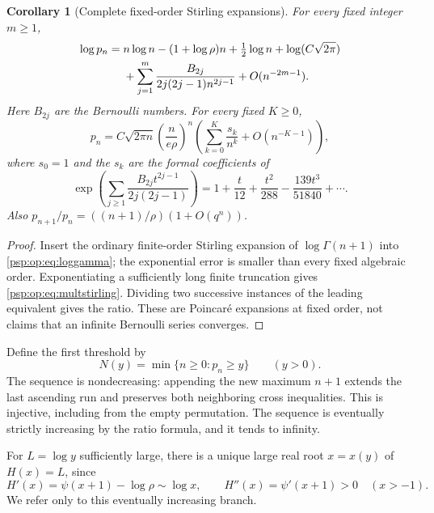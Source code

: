 \documentclass[11pt,letterpaper]{article}
\numberwithin{equation}{section}
\newtheorem{corollary}[theorem]{Corollary}
\theoremstyle{remark}\newtheorem{remark}[theorem]{Remark}
\begin{document}
\begin{corollary}[Complete fixed-order Stirling expansions]\label{psp:op:cor:stirling}
For every fixed integer $m\geq1$,
\begin{align}
 \log p_n={}&n\log n-(1+\log\rho)n+\tfrac12\log n
       +\log(C\sqrt{2\pi})\notag\\
 &+\sum_{j=1}^m\frac{B_{2j}}{2j(2j-1)n^{2j-1}}
       +O(n^{-2m-1}).\label{psp:op:eq:stirling}
\end{align}
Here $B_{2j}$ are the Bernoulli numbers. For every fixed $K\geq0$,
\begin{equation}\label{psp:op:eq:multstirling}
 p_n=C\sqrt{2\pi n}\left(\frac{n}{e\rho}\right)^n
 \left(\sum_{k=0}^K\frac{s_k}{n^k}+O(n^{-K-1})\right),
\end{equation}
where $s_0=1$ and the $s_k$ are the formal coefficients of
\begin{equation}\label{psp:op:eq:stirlingcoeff}
 \exp\left(\sum_{j\geq1}\frac{B_{2j}t^{2j-1}}{2j(2j-1)}\right)
 =1+\frac t{12}+\frac{t^2}{288}-\frac{139t^3}{51840}+\cdots.
\end{equation}
Also $p_{n+1}/p_n=((n+1)/\rho)(1+O(q^n))$.
\end{corollary}
\begin{proof}
Insert the ordinary finite-order Stirling expansion of
$\log\Gamma(n+1)$ into \eqref{psp:op:eq:loggamma}; the exponential error is
smaller than every fixed algebraic order. Exponentiating a sufficiently
long finite truncation gives \eqref{psp:op:eq:multstirling}. Dividing two
successive instances of the leading equivalent gives the ratio.
These are Poincar\'e expansions at fixed order, not claims that an
infinite Bernoulli series converges.
\end{proof}

Define the first threshold by
\[
 N(y)=\min\{n\geq0:p_n\geq y\}\qquad(y>0).
\]
The sequence is nondecreasing: appending the new maximum $n+1$ extends
the last ascending run and preserves both neighboring cross
inequalities. This is injective, including from the empty permutation.
The sequence is eventually strictly increasing by the ratio formula,
and it tends to infinity.

For $L=\log y$ sufficiently large, there is a unique large real root
$x=x(y)$ of $H(x)=L$, since
\[
 H'(x)=\psi(x+1)-\log\rho\sim\log x,
 \qquad H''(x)=\psi'(x+1)>0\quad(x>-1).
\]
We refer only to this eventually increasing branch.
\end{document}

